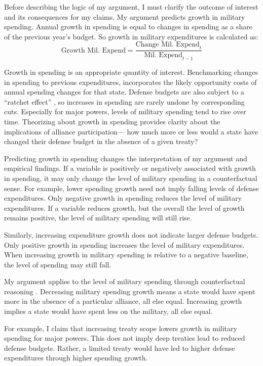 \documentclass[12pt]{article}
\begin{document}
Before describing the logic of my argument, I must clarify the outcome of interest and its consequences for my claims. 
My argument predicts growth in military spending. 
Annual growth in spending is equal to changes in spending as a share of the previous year's budget. 
So growth in military expenditures is calculated as:
\begin{equation}
\mbox{Growth Mil. Expend} = \frac{ \mbox{Change Mil. Expend}_t }{ \mbox{Mil. Expend}_{t-1} }
\end{equation} 


Growth in spending is an appropriate quantity of interest. 
Benchmarking changes in spending to previous expenditures, incorporates the likely opportunity costs of annual spending changes for that state. 
Defense budgets are also subject to a ``ratchet effect'' \cite{Zielinskietal2017}, so increases in spending are rarely undone by corresponding cuts.
Especially for major powers, levels of military spending tend to rise over time. 
Theorizing about growth in spending provides clarity about the implications of alliance participation--- how much more or less would a state have changed their defense budget in the absence of a given treaty? 


Predicting growth in spending changes the interpretation of my argument and empirical findings. 
If a variable is positively or negatively associated with growth in spending, it may only change the level of military spending in a counterfactual sense. 
For example, lower spending growth need not imply falling levels of defense expenditures. 
Only negative growth in spending reduces the level of military expenditures. 
If a variable reduces growth, but the overall the level of growth remains positive, the level of military spending will still rise. 


Similarly, increasing expenditure growth does not indicate larger defense budgets. 
Only positive growth in spending increases the level of military expenditures. 
When increasing growth in military spending is relative to a negative baseline, the level of spending may still fall. 


My argument applies to the level of military spending through counterfactual reasoning \citep{Fearon1991}. 
Decreasing military spending growth means a state would have spent more in the absence of a particular alliance, all else equal. 
Increasing growth implies a state would have spent less on the military, all else equal.


For example, I claim that increasing treaty scope lowers growth in military spending for major powers. 
This does not imply deep treaties lead to reduced defense budgets. 
Rather, a limited treaty would have led to higher defense expenditures through higher spending growth. 
\end{document}
